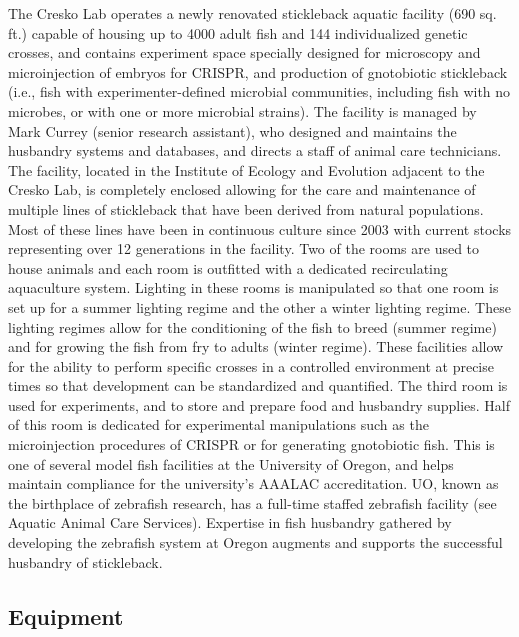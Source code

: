 \documentclass[
]{book}
\begin{document}
The Cresko Lab operates a newly renovated stickleback aquatic facility (690 sq. ft.) capable of housing up to 4000 adult fish and 144 individualized genetic crosses, and contains experiment space specially designed for microscopy and microinjection of embryos for CRISPR, and production of gnotobiotic stickleback (i.e., fish with experimenter-defined microbial communities, including fish with no microbes, or with one or more microbial strains). The facility is managed by Mark Currey (senior research assistant), who designed and maintains the husbandry systems and databases, and directs a staff of animal care technicians. The facility, located in the Institute of Ecology and Evolution adjacent to the Cresko Lab, is completely enclosed allowing for the care and maintenance of multiple lines of stickleback that have been derived from natural populations. Most of these lines have been in continuous culture since 2003 with current stocks representing over 12 generations in the facility. Two of the rooms are used to house animals and each room is outfitted with a dedicated recirculating aquaculture system. Lighting in these rooms is manipulated so that one room is set up for a summer lighting regime and the other a winter lighting regime. These lighting regimes allow for the conditioning of the fish to breed (summer regime) and for growing the fish from fry to adults (winter regime). These facilities allow for the ability to perform specific crosses in a controlled environment at precise times so that development can be standardized and quantified. The third room is used for experiments, and to store and prepare food and husbandry supplies. Half of this room is dedicated for experimental manipulations such as the microinjection procedures of CRISPR or for generating gnotobiotic fish. This is one of several model fish facilities at the University of Oregon, and helps maintain compliance for the university's AAALAC accreditation. UO, known as the birthplace of zebrafish research, has a full-time staffed zebrafish facility (see Aquatic Animal Care Services). Expertise in fish husbandry gathered by developing the zebrafish system at Oregon augments and supports the successful husbandry of stickleback.

\hypertarget{equipment}{%
\subsection{Equipment}\label{equipment}}
\end{document}
